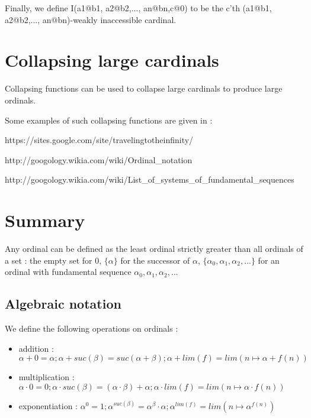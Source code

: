 \documentclass[10pt]{article}
\begin{document}
\bigskip

Finally, we define I(a1@b1, a2@b2,..., an@bn,c@0) to be the c'th (a1@b1, a2@b2,..., an@bn)-weakly inaccessible cardinal.


\section{Collapsing large cardinals}

Collapsing functions can be used to collapse large cardinals to produce large ordinals.

Some examples of such collapsing functions are given in :

https://sites.google.com/site/travelingtotheinfinity/

http://googology.wikia.com/wiki/Ordinal\_notation

http://googology.wikia.com/wiki/List\_of\_systems\_of\_fundamental\_sequences


\begin{comment}
An example of such functions are the "Hypcos's functions" which collapses weakly inaccessible cardinals, described in

https://sites.google.com/site/travelingtotheinfinity/hypcos-s-notation-with-weakly-inaccessibles.
\end{comment}



\section{Summary}

Any ordinal can be defined as the least ordinal strictly greater than all ordinals of a set : the empty set for 0, \(\lbrace \alpha \rbrace\) for the successor of \( \alpha \),  \(\lbrace \alpha_0,\alpha_1,\alpha_2,...\rbrace\) for an ordinal with fundamental sequence \(\alpha_0, \alpha_1, \alpha_2, ...\)

\subsection{Algebraic notation}

We define the following operations on ordinals :

\smallskip
\begin{itemize}
     \setlength{\itemsep}{1pt}
     \setlength{\parskip}{0pt}
     \setlength{\parsep}{0pt}
\item addition : \( \alpha+0=\alpha ; \alpha+suc(\beta)=suc(\alpha+\beta); \alpha+lim(f)=lim(n \mapsto \alpha+f(n)) \)

\item multiplication : \( \alpha \cdot 0 = 0 ; \alpha \cdot suc(\beta) = (\alpha \cdot \beta) + \alpha ; \alpha \cdot lim(f) = lim (n \mapsto \alpha \cdot f(n)) \)

\item exponentiation : \( \alpha^0 = 1 ; \alpha^{suc(\beta)} = \alpha^\beta \cdot \alpha ; \alpha^{lim(f)} = lim (n \mapsto \alpha^{f(n)}) \)
\end{itemize}
\end{document}
